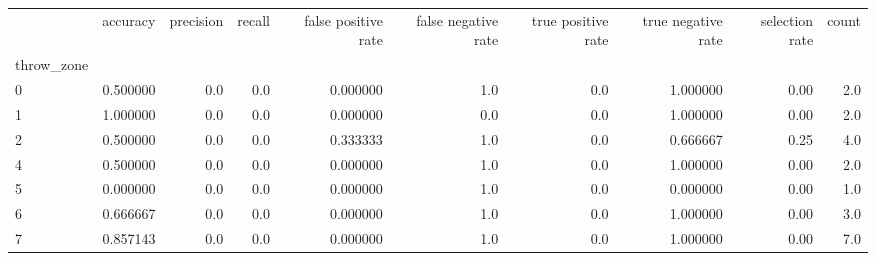 \begin{tabular}{lrrrrrrrrr}
\toprule
{} &  accuracy &  precision &  recall &  false positive rate &  false negative rate &  true positive rate &  true negative rate &  selection rate &  count \\
throw\_zone &           &            &         &                      &                      &                     &                     &                 &        \\
\midrule
0          &  0.500000 &        0.0 &     0.0 &             0.000000 &                  1.0 &                 0.0 &            1.000000 &            0.00 &    2.0 \\
1          &  1.000000 &        0.0 &     0.0 &             0.000000 &                  0.0 &                 0.0 &            1.000000 &            0.00 &    2.0 \\
2          &  0.500000 &        0.0 &     0.0 &             0.333333 &                  1.0 &                 0.0 &            0.666667 &            0.25 &    4.0 \\
4          &  0.500000 &        0.0 &     0.0 &             0.000000 &                  1.0 &                 0.0 &            1.000000 &            0.00 &    2.0 \\
5          &  0.000000 &        0.0 &     0.0 &             0.000000 &                  1.0 &                 0.0 &            0.000000 &            0.00 &    1.0 \\
6          &  0.666667 &        0.0 &     0.0 &             0.000000 &                  1.0 &                 0.0 &            1.000000 &            0.00 &    3.0 \\
7          &  0.857143 &        0.0 &     0.0 &             0.000000 &                  1.0 &                 0.0 &            1.000000 &            0.00 &    7.0 \\
\bottomrule
\end{tabular}
